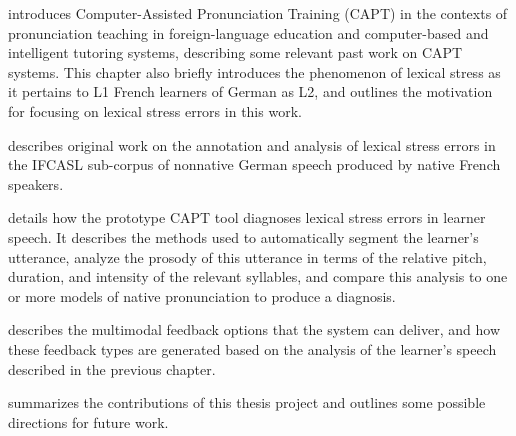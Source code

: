 
 introduces Computer-Assisted Pronunciation Training (CAPT) in the contexts of pronunciation teaching in foreign-language education and computer-based and intelligent tutoring systems, describing some relevant past work on CAPT systems. This chapter also briefly 
introduces the phenomenon of lexical stress as it pertains to L1 French learners of German as L2, and outlines
the motivation for focusing on lexical stress errors in this work.


describes original work on the annotation and analysis of lexical stress errors in the IFCASL sub-corpus of nonnative German speech produced by native French speakers.

 details how the prototype CAPT tool diagnoses lexical stress errors in learner speech. It describes the methods used to automatically segment the learner's utterance, analyze the prosody of this utterance in terms of the relative pitch, duration, and intensity of the relevant syllables, and compare this analysis to one or more models of native pronunciation to produce a diagnosis.

 describes the multimodal feedback options that the system can deliver, and how these feedback types are generated based on the analysis of the learner's speech described in the previous chapter. 


 summarizes the contributions of this thesis project and outlines some 
possible directions for future work.



%

